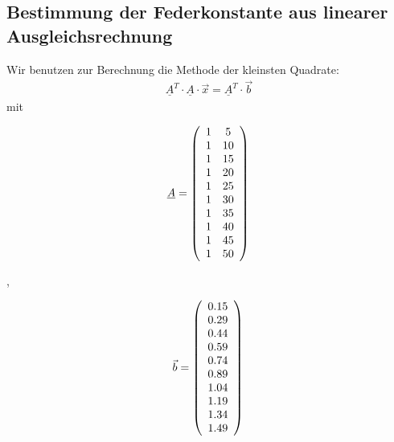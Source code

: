 \subsection{Bestimmung der Federkonstante aus linearer Ausgleichsrechnung}
Wir benutzen zur Berechnung die Methode der kleinsten Quadrate:
\begin{equation}
\begin{aligned}
  \underline{A}^T \cdot \underline{A} \cdot \vec{x} = \underline{A}^T \cdot \vec{b}
\end{aligned}
\end{equation}
mit 
  \begin{minipage}{0.48\linewidth}

    \[
    \underline{A} =
    \left(\begin{array}{cc}
      1 & 5\\
      1 & 10\\
      1 & 15\\
      1 & 20\\
      1 & 25\\
      1 & 30\\
      1 & 35\\
      1 & 40\\
      1 & 45\\
      1 & 50\\
    \end{array} \right)\\
    \]
    \vspace{10pt}
    \end{minipage}
    \begin{minipage}{0.01\linewidth}
    ,
    \end{minipage}
    \begin{minipage}{0.48\linewidth}
    
    \[
    \vec{b} =
    \left(\begin{array}{c}
      0.15\\
      0.29\\
      0.44\\
      0.59\\
      0.74\\
      0.89\\
      1.04\\
      1.19\\
      1.34\\
      1.49\\
    \end{array} \right) \\
    \]
    \vspace{10pt}
    \end{minipage}
